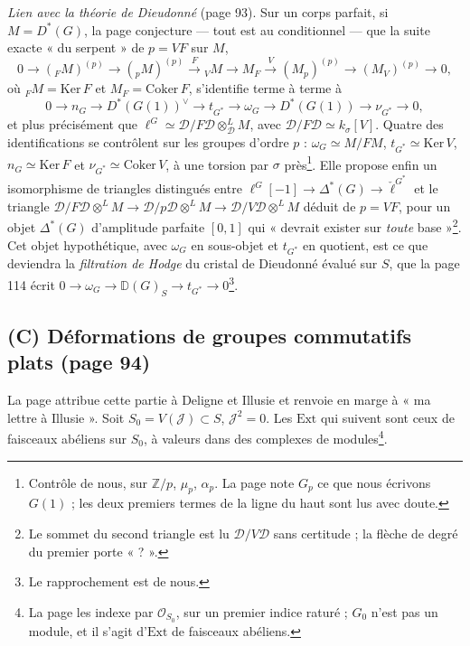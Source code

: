 \documentclass[11pt,a4paper]{article}
\begin{document}
\emph{Lien avec la théorie de Dieudonné} (page 93). Sur un corps parfait,
si $M = D^{*}(G)$, la page conjecture — tout est au conditionnel — que
la suite exacte « du serpent » de $p = V F$ sur $M$,
\[
0 \to ({}_F M)^{(p)} \to ({}_p M)^{(p)} \xrightarrow{F} {}_V M \to M_F
\xrightarrow{V} (M_p)^{(p)} \to (M_V)^{(p)} \to 0,
\]
où ${}_F M = \mathrm{Ker}\, F$ et $M_F = \mathrm{Coker}\, F$, s'identifie
terme à terme à
\[
0 \to n_G \to D^{*}(G(1))^{\vee} \to t_{G^{*}} \to \omega_G \to
D^{*}(G(1)) \to \nu_{G^{*}} \to 0 ,
\]
et plus précisément que $\ell^{G} \simeq \mathcal{D}/F\mathcal{D}
\otimes^{L}_{\mathcal{D}} M$, avec $\mathcal{D}/F\mathcal{D} \simeq
k_{\sigma}[V]$. Quatre des identifications se contrôlent sur les groupes
d'ordre $p$ : $\omega_G \simeq M/FM$, $t_{G^{*}} \simeq \mathrm{Ker}\, V$,
$n_G \simeq \mathrm{Ker}\, F$ et $\nu_{G^{*}} \simeq \mathrm{Coker}\, V$,
à une torsion par $\sigma$ près\footnote{Contrôle de nous, sur $\mathbb{Z}/p$, $\mu_p$, $\alpha_p$.
La page note $G_p$ ce que nous écrivons $G(1)$ ; les deux premiers termes
de la ligne du haut sont lus avec doute.}. Elle propose enfin un
isomorphisme de triangles distingués entre
$\ell^{G}[-1] \to \Delta^{*}(G) \to \check{\ell}^{G^{*}}$ et le triangle
$\mathcal{D}/F\mathcal{D} \otimes^{L} M \to \mathcal{D}/p\mathcal{D}
\otimes^{L} M \to \mathcal{D}/V\mathcal{D} \otimes^{L} M$ déduit de $p =
VF$, pour un objet $\Delta^{*}(G)$ d'amplitude parfaite $[0, 1]$ qui
« devrait exister sur \emph{toute} base »\footnote{Le sommet du second
triangle est lu $\mathcal{D}/V\mathcal{D}$ sans certitude ; la flèche de
degré du premier porte « ? ».}. Cet objet hypothétique, avec $\omega_G$ en
sous-objet et $t_{G^{*}}$ en quotient, est ce que deviendra la
\emph{filtration de Hodge} du cristal de Dieudonné évalué sur $S$, que
la page 114 écrit $0 \to \omega_G \to \mathbb{D}(G)_S \to t_{G^{*}} \to
0$\footnote{Le rapprochement est de nous.}.

\subsection*{(C) Déformations de groupes commutatifs plats (page 94)}

La page attribue cette partie à Deligne et Illusie et renvoie en marge à
« ma lettre à Illusie ». Soit $S_0 = V(\mathcal{J}) \subset S$,
$\mathcal{J}^{2} = 0$. Les $\mathrm{Ext}$ qui suivent sont ceux de
faisceaux abéliens sur $S_0$, à valeurs dans des complexes de
modules\footnote{La page les indexe par $\mathcal{O}_{S_0}$, sur un
premier indice raturé ; $G_0$ n'est pas un module, et il s'agit d'$\mathrm{Ext}$
de faisceaux abéliens.}.
\end{document}
